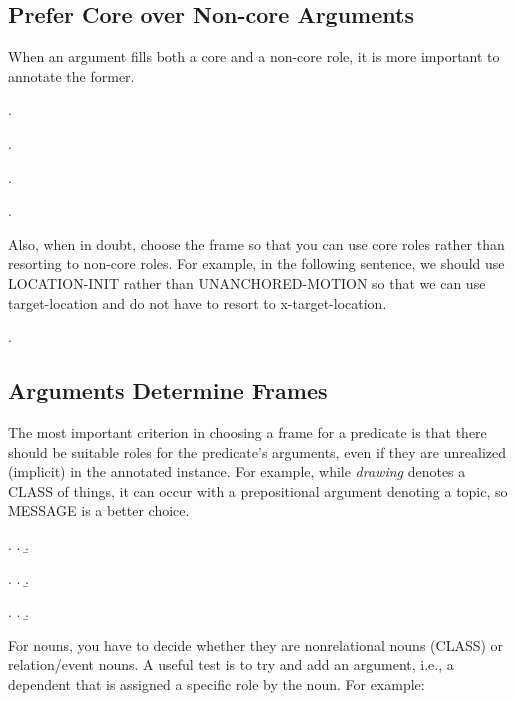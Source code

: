 \documentclass[a4paper]{article}
\newcommand{\fr}[1]{\textsf{#1}}
\newcommand{\rl}[1]{\textsf{#1}}
\begin{document}
\subsection{Prefer Core over Non-core Arguments}

When an argument fills both a core and a non-core role, it is more important to
annotate the former.

\ex.

\ex.

\ex.

\ex.

Also, when in doubt, choose the frame so that you can use core roles rather
than resorting to non-core roles. For example, in the following sentence, we
should use \fr{LOCATION-INIT} rather than \fr{UNANCHORED-MOTION} so that we can
use \rl{target-location} and do not have to resort to \fr{x-target-location}.

\ex.


\newpage\subsection{Arguments Determine Frames}

The most important criterion in choosing a frame for a predicate is that there
should be suitable roles for the predicate's arguments, even if they are
unrealized (implicit) in the annotated instance. For example, while
\emph{drawing} denotes a \fr{CLASS} of things, it can occur with a
prepositional argument denoting a \rl{topic}, so \fr{MESSAGE} is a better
choice.

\ex.
\a.
\b.

\ex.
\a.
\b.

\ex.
\a.
\b.

For nouns, you have to decide whether they are nonrelational nouns (\fr{CLASS}) or relation/event nouns. A useful test is to try and add an argument, i.e., a dependent that is assigned a specific role by the noun. For example:
\end{document}
